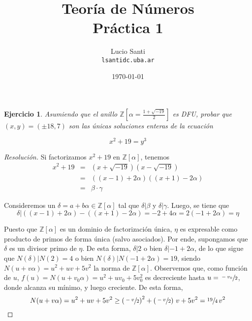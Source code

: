\documentclass[a4paper,11pt]{article}
\title{Teoría de Números\\
      \small{Práctica 1}}
\author{Lucio Santi\\
        \texttt{lsanti\at dc.uba.ar}}
\date{\today}
\newcommand{\Zm}[1]{\ensuremath{\mathbb{Z}[#1]}}
\newcommand{\Div}[2]{\ensuremath{#1 | #2}}
\newtheorem*{ej}{Ejercicio}
\begin{document}
\maketitle

\begin{ej} 
    Asumiendo que el anillo \Zm{\alpha = \frac{1 + \sqrt{-19}}{2}} es DFU, probar que $(x, y) = (\pm 18, 7)$
son las únicas soluciones enteras de la ecuación

    $$x^2 + 19 = y^3$$
\end{ej}

\begin{proof}[Resoluci\'on]
Si factorizamos $x^2 + 19$ en \Zm{\alpha}, tenemos
\begin{eqnarray*}
    x^2 + 19 &=& (x + \sqrt{-19}) (x - \sqrt{-19}) \\
             &=& \left((x-1) + 2\alpha \right) \left((x+1) - 2\alpha\right) \\
             &=& \beta \cdot \gamma
\end{eqnarray*}

Consideremos un
$\delta = a + b \alpha \in \Zm{\alpha}$
tal que $\Div{\delta}{\beta}$ y $\Div{\delta}{\gamma}$. Luego, se tiene que
$$\Div{\delta}{\left((x-1) + 2\alpha \right) - \left((x+1) - 2\alpha\right)} = -2 + 4\alpha = 2 (-1 + 2\alpha) = \eta$$

Puesto que \Zm{\alpha} es un dominio de factorización única, $\eta$ es expresable como producto de primos
de forma única (salvo asociados). Por ende, supongamos que $\delta$ es un divisor primo de $\eta$. De esta forma,
$\Div{\delta}{2}$ o bien $\Div{\delta}{-1 + 2\alpha}$, de lo que sigue que 
$\Div{N(\delta)}{N(2) = 4}$ o bien \Div{N(\delta)}{N(-1 + 2\alpha) = 19}, siendo $N(u + v \alpha) = u^2 + uv + 5v^2$
la norma de \Zm{\alpha}. Observemos que, como función de $u$, $f(u) = N(u + v_0\alpha) = u^2 + uv_0 + 5v_0^2$ es
decreciente hasta $u = \sfrac{-v_0}{2}$, donde alcanza su mínimo, y luego creciente. De esta forma,
$$N(u + v\alpha) = u^2 + uv + 5v^2 \geq \left(\sfrac{-v}{2}\right)^2 + \left(\sfrac{-v}{2}\right) \, v + 5v^2 = \sfrac{19}{4} \, v^2$$


\end{proof}
\end{document}

